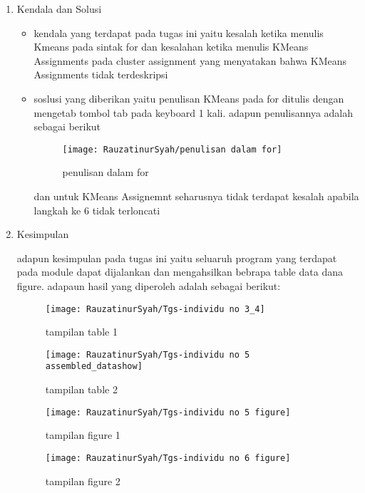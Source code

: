 \begin{enumerate}
\item Kendala dan Solusi
\begin{itemize}
\item kendala yang terdapat pada tugas ini yaitu kesalah ketika menulis Kmeans pada sintak for dan kesalahan ketika menulis KMeans Assignments pada cluster assignment yang menyatakan bahwa KMeans Assignments tidak terdeskripsi
\item soslusi yang diberikan yaitu penulisan KMeans pada for ditulis dengan mengetab tombol tab pada keyboard 1 kali. adapun penulisannya adalah sebagai berikut

\newpage
\begin{figure}[!ht]
\texttt{[image: RauzatinurSyah/penulisan dalam for]}
\caption{penulisan dalam for}
\label{gam:penulisan dalam for}
\end{figure}

dan untuk KMeans Assignemnt seharusnya tidak terdapat kesalah apabila langkah ke 6 tidak terloncati

\end{itemize}

\item Kesimpulan

adapun kesimpulan pada tugas ini yaitu seluaruh program yang terdapat pada module dapat dijalankan dan mengahsilkan bebrapa table data dana figure. adapaun hasil yang diperoleh adalah sebagai berikut:

\begin{figure}[!ht]
\texttt{[image: RauzatinurSyah/Tgs-individu no 3\_4]}
\caption{tampilan table 1}
\label{gam:hasil tugas individu}
\end{figure}

\begin{figure}[!ht]
\texttt{[image: RauzatinurSyah/Tgs-individu no 5 assembled\_datashow]}
\caption{tampilan table 2}
\label{gam:hasil tugas individu}
\end{figure}

\begin{figure}[!ht]
\texttt{[image: RauzatinurSyah/Tgs-individu no 5 figure]}
\caption{tampilan figure 1}
\label{gam:hasil tugas individu}
\end{figure}

\begin{figure}[!ht]
\texttt{[image: RauzatinurSyah/Tgs-individu no 6 figure]}
\caption{tampilan figure 2}
\label{gam:hasil tugas individu}
\end{figure}

\end{enumerate}



